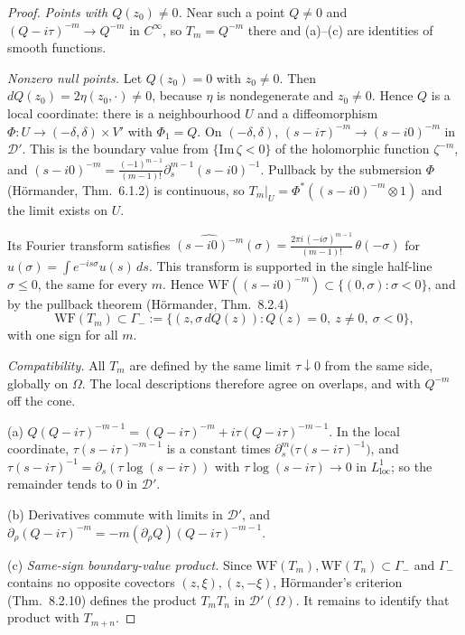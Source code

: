 \documentclass{article}
\theoremstyle{remark}
\begin{document}
\begin{proof}
\emph{Points with $Q(z_0)\neq0$.} Near such a point $Q\neq0$ and $(Q-i\tau)^{-m}\to Q^{-m}$ in $C^\infty$, so $T_m=Q^{-m}$ there and (a)--(c) are identities of smooth functions.

\emph{Nonzero null points.} Let $Q(z_0)=0$ with $z_0\ne0$.
Then $dQ(z_0)=2\eta(z_0,\cdot)\neq0$, because $\eta$ is nondegenerate and $z_0\neq0$.
Hence $Q$ is a local coordinate: there is a neighbourhood $U$ and a diffeomorphism $\Phi:U\to(-\delta,\delta)\times V'$ with $\Phi_1=Q$.
On $(-\delta,\delta)$, $(s-i\tau)^{-m}\to(s-i0)^{-m}$ in $\mathcal D'$.
This is the boundary value from $\{\mathrm{Im}\,\zeta<0\}$ of the holomorphic function $\zeta^{-m}$, and $(s-i0)^{-m}=\frac{(-1)^{m-1}}{(m-1)!}\partial_s^{m-1}(s-i0)^{-1}$.
Pullback by the submersion $\Phi$ (H\"ormander, Thm.~6.1.2) is continuous, so $T_m|_U=\Phi^*((s-i0)^{-m}\otimes1)$ and the limit exists on $U$.

Its Fourier transform satisfies $\widehat{(s-i0)^{-m}}(\sigma)=\frac{2\pi i\,(-i\sigma)^{m-1}}{(m-1)!}\,\theta(-\sigma)$ for $\hat u(\sigma)=\int e^{-is\sigma}u(s)\,ds$.
This transform is supported in the single half-line $\sigma\le0$, the same for every $m$.
Hence $\mathrm{WF}((s-i0)^{-m})\subset\{(0,\sigma):\sigma<0\}$, and by the pullback theorem (H\"ormander, Thm.~8.2.4)
\[
\mathrm{WF}(T_m)\subset\Gamma_-:=\{(z,\sigma\,dQ(z)):Q(z)=0,\ z\ne0,\ \sigma<0\},
\]
with one sign for all $m$.

\emph{Compatibility.} All $T_m$ are defined by the same limit $\tau\downarrow0$ from the same side, globally on $\Omega$.
The local descriptions therefore agree on overlaps, and with $Q^{-m}$ off the cone.

(a) $Q(Q-i\tau)^{-m-1}=(Q-i\tau)^{-m}+i\tau(Q-i\tau)^{-m-1}$.
In the local coordinate, $\tau(s-i\tau)^{-m-1}$ is a constant times $\partial_s^{m}\bigl(\tau(s-i\tau)^{-1}\bigr)$, and $\tau(s-i\tau)^{-1}=\partial_s(\tau\log(s-i\tau))$ with $\tau\log(s-i\tau)\to0$ in $L^1_{\mathrm{loc}}$; so the remainder tends to $0$ in $\mathcal D'$.

(b) Derivatives commute with limits in $\mathcal D'$, and $\partial_\rho(Q-i\tau)^{-m}=-m(\partial_\rho Q)(Q-i\tau)^{-m-1}$.

(c) \emph{Same-sign boundary-value product.} Since $\mathrm{WF}(T_m),\mathrm{WF}(T_n)\subset\Gamma_-$ and $\Gamma_-$ contains no opposite covectors $(z,\xi),(z,-\xi)$, H\"ormander's criterion (Thm.~8.2.10) defines the product $T_mT_n$ in $\mathcal D'(\Omega)$.
It remains to identify that product with $T_{m+n}$.


\end{proof}
\end{document}
